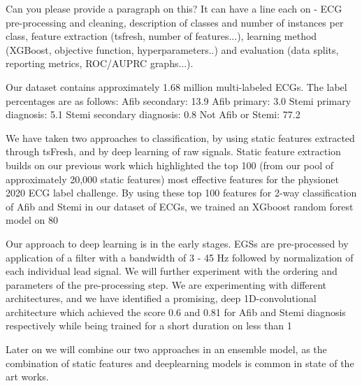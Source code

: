 \documentclass[\main/thesis.tex]{subfiles}
\begin{document}
Can you please provide a paragraph on this? It can have a line each on - ECG  pre-processing and cleaning, description of classes and number of instances per class, feature extraction (tsfresh, number of features...), learning method (XGBoost, objective function, hyperparameters..) and evaluation (data splits, reporting metrics, ROC/AUPRC graphs...).

Our dataset contains approximately 1.68 million multi-labeled ECGs. The label percentages are as follows:
Afib secondary: 13.9%
Afib primary: 3.0%
Stemi primary diagnosis: 5.1%
Stemi secondary diagnosis: 0.8%
Not Afib or Stemi: 77.2%

We have taken two approaches to classification, by using static features extracted through tsFresh, and by deep learning of raw signals. Static feature extraction builds on our previous work which highlighted the top 100 (from our pool of approximately 20,000 static features) most effective features for the physionet 2020 ECG label challenge. By using these top 100 features for 2-way classification of Afib and Stemi in our dataset of ECGs, we trained an XGboost random forest model on 80%

Our approach to deep learning is in the early stages. EGSs are pre-processed by application of a filter with a bandwidth of 3 - 45 Hz followed by normalization of each individual lead signal. We will further experiment with the ordering and parameters of the pre-processing step. We are experimenting with different architectures, and we have identified a promising, deep 1D-convolutional architecture which achieved the score 0.6 and 0.81 for Afib and Stemi diagnosis respectively while being trained for a short duration on less than 1%

Later on we will combine our two approaches in an ensemble model, as the combination of static features and deeplearning models is common in state of the art works. 
\end{document}

